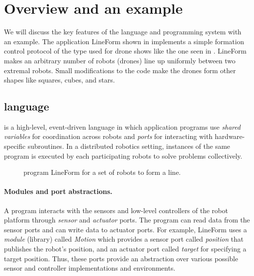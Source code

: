 \section{Overview and an example}
\label{sec:overview}

\newcommand{\LineForm}{\textsf{LineForm}\xspace}

We will discuss the key features of the \lgname language and programming system with an example.
The \lgname application \LineForm shown in  implements a simple formation control protocol of the type  used for drone shows like the one seen in .
\LineForm makes an arbitrary number of robots (drones) line up uniformly between two extremal robots.
Small modifications to the code make the drones form other shapes like squares, cubes, and stars.

\subsection{\lgname language}
\label{sec:koord-language}
\lgname is a high-level, event-driven language in which application programs use \emph{shared variables} for coordination across robots
and \emph{ports} for interacting with hardware-specific subroutines.
In a distributed robotics setting, instances of the same \lgname program is executed by each participating robots to solve problems collectively.

\begin{figure}[h!]
    {
        
    }
    {
        
    }
    \caption{\lgname program \LineForm for a set of robots to form a line.}
    \label{fig:lineform}
\end{figure}

\paragraph{Modules and port abstractions.}
A \lgname program interacts with the sensors and low-level controllers of the robot platform through \emph{sensor} and \emph{actuator} ports.
%
%
The program can read data from the sensor ports and can write data to actuator ports.
%
For example, \LineForm uses a \emph{module} (library) called \emph{Motion} which provides a sensor port called \emph{position} that publishes the robot's position, and an actuator port called \emph{target} for specifying a target position.
%
Thus, these  ports provide an abstraction over various possible sensor and controller implementations and environments.
%


